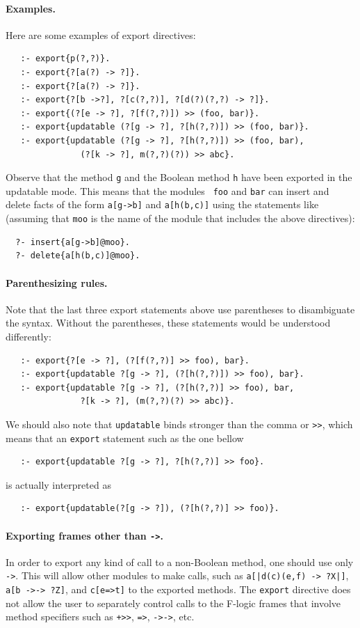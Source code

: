 \documentclass[11pt]{article}
\begin{document}
\paragraph{Examples.}
Here are some examples of export directives:
\begin{verbatim}
   :- export{p(?,?)}.
   :- export{?[a(?) -> ?]}.
   :- export{?[a(?) -> ?]}.
   :- export{?[b ->?], ?[c(?,?)], ?[d(?)(?,?) -> ?]}.
   :- export{(?[e -> ?], ?[f(?,?)]) >> (foo, bar)}.
   :- export{updatable (?[g -> ?], ?[h(?,?)]) >> (foo, bar)}.
   :- export{updatable (?[g -> ?], ?[h(?,?)]) >> (foo, bar),
               (?[k -> ?], m(?,?)(?)) >> abc}.
\end{verbatim}
Observe that the method {\tt g} and the Boolean method {\tt h}
have been exported in the updatable mode. This means that the modules {\tt
  foo} and {\tt bar} can insert and delete facts of the form 
{\tt a[g->b]} and {\tt a[h(b,c)]} using the statements like
(assuming that {\tt moo} is the name of the module that includes the above
directives): 
\begin{verbatim}
  ?- insert{a[g->b]@moo}.
  ?- delete{a[h(b,c)]@moo}.
\end{verbatim}

\paragraph{Parenthesizing rules.}
Note that the last three export statements above use parentheses to
disambiguate the syntax. Without the parentheses, these statements would be
understood differently:
\begin{verbatim}
   :- export{?[e -> ?], (?[f(?,?)] >> foo), bar}.
   :- export{updatable ?[g -> ?], (?[h(?,?)]) >> foo), bar}.
   :- export{updatable ?[g -> ?], (?[h(?,?)] >> foo), bar,
               ?[k -> ?], (m(?,?)(?) >> abc)}.  
\end{verbatim}
We should also note that {\tt updatable} binds stronger than the comma or
{\tt >{}>}, which means that an {\tt export} statement such as the one bellow
\begin{verbatim}
   :- export{updatable ?[g -> ?], ?[h(?,?)] >> foo}.
\end{verbatim}
is actually interpreted as
\begin{verbatim}
   :- export{updatable(?[g -> ?]), (?[h(?,?)] >> foo)}.
\end{verbatim}

\paragraph{Exporting frames other than {\tt ->}.}  
In order to export any kind of call to a non-Boolean
method, one should use only {\tt ->}. This will
allow other modules to make calls, such as {\tt a[|d(c)(e,f) -> ?X|]}, {\tt
  a[b ->-> ?Z]}, and {\tt c[e=>t]}  to the exported methods.  The {\tt export}
directive does not allow the user to separately control calls to the
F-logic frames that involve method specifiers such as {\tt +>{}>}, {\tt =>},
{\tt ->->}, etc.
\end{document}
